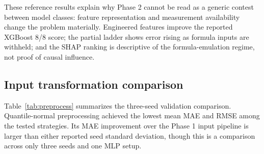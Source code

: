 \documentclass[conference]{IEEEtran}
\begin{document}
\begin{table}[!t]
\centering
\caption{Reported top ten XGBoost features by mean absolute TreeSHAP value (10,000 sampled test instances, 8/8 regime).}
\label{tab:shap}
\end{table}

These reference results explain why Phase 2 cannot be read as a generic contest between model classes: feature representation and measurement availability change the problem materially. Engineered features improve the reported XGBoost 8/8 score; the partial ladder shows error rising as formula inputs are withheld; and the SHAP ranking is descriptive of the formula-emulation regime, not proof of causal influence.

\subsection{Input transformation comparison}
Table~\ref{tab:preprocess} summarizes the three-seed validation comparison. Quantile-normal preprocessing achieved the lowest mean MAE and RMSE among the tested strategies. Its MAE improvement over the Phase 1 input pipeline is larger than either reported seed standard deviation, though this is a comparison across only three seeds and one MLP setup.
\begin{table}[!t]
\centering
\caption{Three-seed validation performance by neural input transformation. Values are mean $\pm$ standard deviation.}
\label{tab:preprocess}
\end{table}
\end{document}
